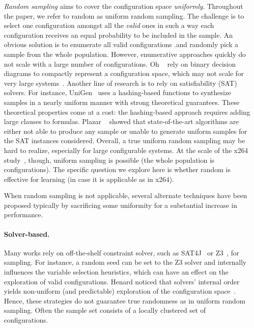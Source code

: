 \textit{Random sampling} aims to cover the configuration space \emph{uniformly}. Throughout the paper, we refer to random as uniform random sampling. The challenge is to select one configuration amongst all the \emph{valid} ones in such a way each configuration receives an equal probability to be included in the sample. 
An obvious solution is to enumerate all valid configurations
.and randomly pick a sample from the whole population. However, enumerative approaches quickly do not scale with a large number of configurations. 
Oh \etal~\cite{jehooh2017} rely on binary decision diagrams to compactly represent a configuration space, which may not scale for very large systems~\cite{mendonca2008}.
Another line of research is to rely on satisfiability (SAT) solvers. 
For instance, UniGen~\cite{chakraborty2013scalable,DBLP:conf/tacas/ChakrabortyFMSV15} 
uses a hashing-based functions to synthesize samples in a nearly uniform manner with strong theoretical guarantees. These theoretical properties come at a cost: the hashing-based approach requires adding large clauses to formulas. %
 Plazar \etal~\cite{plazar2019} showed that state-of-the-art algorithms are either not able to produce any sample or unable to generate uniform samples for the SAT instances considered. 
 Overall, a true uniform random sampling may be hard to realize, especially for large configurable systems. At the scale of the x264 study~\cite{kaltenecker2019}, though, uniform sampling is possible (the whole population is \nbconfigurations\xspace configurations). The specific question we explore here is whether random is effective for learning (in case it is applicable as in x264).  

When random sampling is not applicable, several alternate techniques have been proposed typically by sacrificing some uniformity for a substantial increase in performance. 


\paragraph{Solver-based.} Many works rely on off-the-shelf
constraint solver, such as SAT4J~\cite{sat4j} or Z3~\cite{Z3}, for sampling. 
For instance, a random seed can be set to the Z3 solver and internally influences the variable selection heuristics, which can have an effect on the exploration of valid configurations.
Henard \etal noticed that solvers' internal order yields non-uniform (and predictable) exploration of the configuration space~\cite{DBLP:journals/tse/HenardPPKHT14}.
Hence, these strategies do not guarantee true randomness as
in uniform random sampling. Often the sample set consists of a locally clustered set of configurations. 
 

